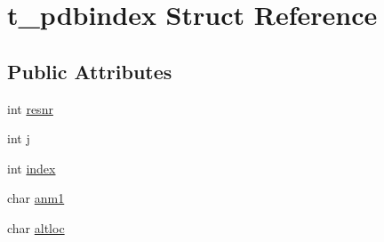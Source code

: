 \hypertarget{structt__pdbindex}{\section{t\-\_\-pdbindex \-Struct \-Reference}
\label{structt__pdbindex}
}
\subsection*{\-Public \-Attributes}
\begin{DoxyCompactItemize}
\item 
int \hyperlink{structt__pdbindex_ac5b86256452cafa3f1fce790b7a724e4}{resnr}
\item 
int \hyperlink{structt__pdbindex_a4b617779c2bad24eb7be1e0f283a24eb}{j}
\item 
int \hyperlink{structt__pdbindex_abd6de05cb79eed09d021bcb051ca1309}{index}
\item 
char \hyperlink{structt__pdbindex_aee519424c2e6d3419fdde3b6c7bffeeb}{anm1}
\item 
char \hyperlink{structt__pdbindex_a60a58fcbb512963a2138a2d6e6797d6c}{altloc}
\end{DoxyCompactItemize}


